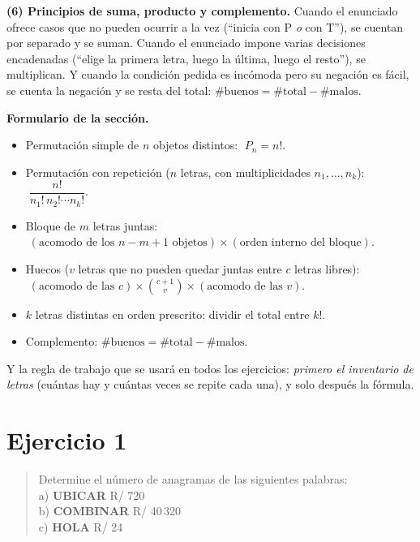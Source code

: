 \documentclass[11pt]{article}
\begin{document}
\begin{teo}
\medskip
\textbf{(6) Principios de suma, producto y complemento.} Cuando el enunciado ofrece casos que no pueden
ocurrir a la vez (``inicia con P \emph{o} con T''), se cuentan por separado y se suman. Cuando el enunciado
impone varias decisiones encadenadas (``elige la primera letra, luego la última, luego el resto''), se
multiplican. Y cuando la condición pedida es incómoda pero su negación es fácil, se cuenta la negación y se
resta del total: $\#\text{buenos} = \#\text{total} - \#\text{malos}$.
\end{teo}

\begin{tip}
\textbf{Formulario de la sección.}
\begin{itemize}[leftmargin=1.4em]
\item Permutación simple de $n$ objetos distintos: $\;P_n=n!$.
\item Permutación con repetición ($n$ letras, con multiplicidades $n_1,\dots,n_k$):
$\;\dfrac{n!}{n_1!\,n_2!\cdots n_k!}$.
\item Bloque de $m$ letras juntas: $\;(\text{acomodo de los } n-m+1 \text{ objetos})\times(\text{orden interno del bloque})$.
\item Huecos ($v$ letras que no pueden quedar juntas entre $c$ letras libres):
$\;(\text{acomodo de las } c)\times\binom{c+1}{v}\times(\text{acomodo de las } v)$.
\item $k$ letras distintas en orden prescrito: dividir el total entre $k!$.
\item Complemento: $\#\text{buenos}=\#\text{total}-\#\text{malos}$.
\end{itemize}
Y la regla de trabajo que se usará en todos los ejercicios: \emph{primero el inventario de letras}
(cuántas hay y cuántas veces se repite cada una), y solo después la fórmula.
\end{tip}

\section*{Ejercicio 1}

\begin{quote}
Determine el número de anagramas de las siguientes palabras:\\
a) \textbf{UBICAR} \hfill R/ 720\\
b) \textbf{COMBINAR} \hfill R/ 40\,320\\
c) \textbf{HOLA} \hfill R/ 24
\end{quote}
\end{document}

